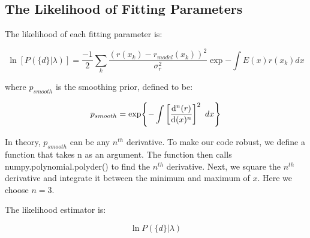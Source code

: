 \subsection{The Likelihood of Fitting Parameters}
\label{subsec:likelihood}

The likelihood of each fitting parameter is:

\begin{equation}
\label{likelihood}
\ln{[P(\{d\}|\lambda)]} = \frac{-1}{2}\sum_{k} \frac{(r(x_k) - r_{model}(x_k))^2}{\sigma_r^2} \exp{-\int E(x)r(x_k)dx}
\end{equation}

where $p_{smooth}$ is the smoothing prior, defined to be:

\begin{equation}
\label{smoothing_prior}
p_{smooth} = \exp{-\int \bigg[\dv[n]{(r)}{(x)}\bigg]^2 \hspace{5pt} dx}
\end{equation}

In theory, $p_{smooth}$ can be any $n^{th}$ derivative. To make our code robust, we define a function that takes n as an argument. The function then calls numpy.polynomial.polyder() to find the $n^{th}$ derivative. Next, we square the $n^{th}$ derivative and integrate it between the minimum and maximum of $x$. Here we choose $n = 3$.

The likelihood estimator is:

\begin{equation}
\label{likelihood_estimator}
\ln{P(\{d\}|\lambda)}
\end{equation}

